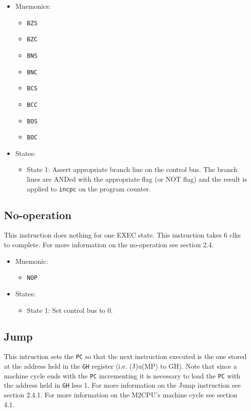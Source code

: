 \documentclass[a4paper,12pt]{article}
\newcommand{\mt}{M2CPU}
\newcommand{\Gr}{\texttt{G}}
\newcommand{\Hr}{\texttt{H}}
\newcommand{\PC}{\texttt{PC}}
\begin{document}
\begin{itemize}
\item Mnemonics:
\begin{itemize}
	\item \texttt{BZS}
	\item \texttt{BZC}
	\item \texttt{BNS}
	\item \texttt{BNC}
	\item \texttt{BCS}
	\item \texttt{BCC}
	\item \texttt{BOS}
	\item \texttt{BOC}
\end{itemize}
\item States:
\begin{itemize}
	\item State 1: Assert appropriate branch line on the control bus. The
	branch lines are ANDed with the appropriate flag (or NOT flag) and the
	result is applied to \texttt{incpc} on the program counter.
\end{itemize}
\end{itemize}

\subsection{No-operation}
This instruction does nothing for one EXEC state. This instruction takes 6 clks
to complete. For more information on the no-operation see section 2.4.
\begin{itemize}
\item Mnemonic:
\begin{itemize}
	\item \texttt{NOP}
\end{itemize}
\item States:
\begin{itemize}
	\item State 1: Set control bus to 0.
\end{itemize}
\end{itemize}

\subsection{Jump}
This intruction sets the \PC{} so that the next instruction executed is the one
stored at the address held in the \Gr{}\Hr{} register (i.e. (J)u(MP) to GH).
Note that since a machine cycle ends with the \PC{} incrementing it is 
necessary to load the \PC{} with the address held in \Gr{}\Hr{} less 1. For 
more information on the Jump instruction see section 2.4.1. For more 
information on the \mt{}'s machine cycle see section 4.1.
\par
\end{document}
